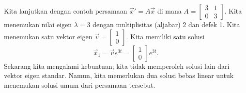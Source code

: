 \begin{example}
Kita lanjutkan dengan
contoh persamaan ${\vec{x}}' = A\vec{x}$
di mana
$A = \left[ \begin{smallmatrix}
3 & 1 \\ 0 & 3
\end{smallmatrix} \right]$.
Kita menemukan nilai eigen $\lambda=3$ dengan multiplisitas (aljabar) 2 dan defek 1.
Kita menemukan satu vektor eigen 
$\vec{v} = \left[ \begin{smallmatrix} 1 \\ 0 \end{smallmatrix} \right]$.
Kita memiliki satu solusi
\begin{equation*}
\vec{x}_1 = \vec{v} e^{3t} = \begin{bmatrix} 1 \\ 0 \end{bmatrix} e^{3t} .
\end{equation*}
Sekarang kita mengalami kebuntuan; kita tidak memperoleh solusi lain dari vektor eigen standar.  Namun,
kita memerlukan dua solusi bebas linear untuk menemukan solusi umum dari
persamaan tersebut.


\end{example}
